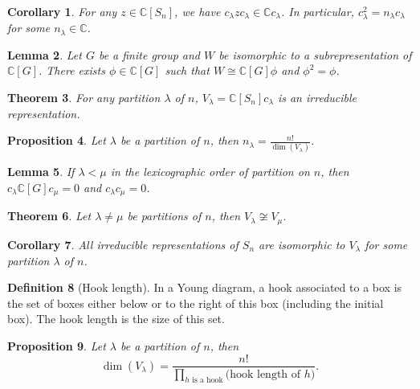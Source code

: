 \documentclass[paper=a4, fontsize=12pt]{scrartcl} %
\newtheorem{thm}{Theorem}
\newtheorem{cor}[thm]{Corollary}
\newtheorem{prop}[thm]{Proposition}
\newtheorem{lem}[thm]{Lemma}
\theoremstyle{definition}
\newtheorem{defn}[thm]{Definition}
\theoremstyle{remark}
\newcommand{\C}{\mathbb{C}}
\begin{document}
\begin{cor}
	For any $z \in \C[S_n]$, we have $c_{\lambda}zc_{\lambda} \in \C c_{\lambda}$. In particular, $c_{\lambda}^2 = n_{\lambda}c_{\lambda}$ for some $n_{\lambda} \in \C$.
\end{cor}
\begin{lem}
	Let $G$ be a finite group and $W$ be isomorphic to a subrepresentation of $\C[G]$. There exists $\phi \in \C[G]$ such that $W \cong \C[G]\phi$ and $\phi^2 = \phi$.
\end{lem}
\begin{thm}
	For any partition $\lambda$ of $n$, $V_{\lambda} = \C[S_n]c_{\lambda}$ is an irreducible representation.
\end{thm}
\begin{prop}
	Let $\lambda$ be a partition of $n$, then $n_{\lambda} = \frac{n!}{\dim(V_{\lambda})}$.
\end{prop}
\begin{lem}
	If $\lambda < \mu$ in the lexicographic order of partition on $n$, then $c_{\lambda}\C[G]c_{\mu} = 0$ and $c_{\lambda}c_{\mu} = 0$.
\end{lem}
\begin{thm}
	Let $\lambda \neq \mu$ be partitions of $n$, then $V_{\lambda} \not\cong V_{\mu}$.
\end{thm}
\begin{cor}
	All irreducible representations of $S_n$ are isomorphic to $V_{\lambda}$ for some partition $\lambda$ of $n$.
\end{cor}
\begin{defn}[Hook length]
	In a Young diagram, a hook associated to a box is the set of boxes either below or to the right of this box (including the initial box). The hook length is the size of this set.	
\end{defn}
\begin{prop}
	Let $\lambda$ be a partition of $n$, then 
	$$\dim(V_{\lambda}) = \frac{n!}{\prod_{\text{$h$ is a hook}} \text{(hook length of $h$)}}.$$
\end{prop}
\end{document}
